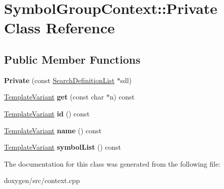 \hypertarget{class_symbol_group_context_1_1_private}{}\section{Symbol\+Group\+Context\+::Private Class Reference}
\label{class_symbol_group_context_1_1_private}
\subsection*{Public Member Functions}
\begin{DoxyCompactItemize}
\item 
\mbox{\label{class_symbol_group_context_1_1_private_a8772de05ec544d807e1ac17cf0039007}} 
{\bfseries Private} (const \mbox{\hyperlink{class_search_definition_list}{Search\+Definition\+List}} $\ast$sdl)
\item 
\mbox{\label{class_symbol_group_context_1_1_private_a9fc2a4c92d326cf087f13e2836890297}} 
\mbox{\hyperlink{class_template_variant}{Template\+Variant}} {\bfseries get} (const char $\ast$n) const
\item 
\mbox{\label{class_symbol_group_context_1_1_private_a1b10b26cede0b44f6aa4afeefec0c0dd}} 
\mbox{\hyperlink{class_template_variant}{Template\+Variant}} {\bfseries id} () const
\item 
\mbox{\label{class_symbol_group_context_1_1_private_a737098d6a7f9bd455a7ee62088e9b6ca}} 
\mbox{\hyperlink{class_template_variant}{Template\+Variant}} {\bfseries name} () const
\item 
\mbox{\label{class_symbol_group_context_1_1_private_a0a1ffb482f51205a576c92f736d971b3}} 
\mbox{\hyperlink{class_template_variant}{Template\+Variant}} {\bfseries symbol\+List} () const
\end{DoxyCompactItemize}


The documentation for this class was generated from the following file\+:\begin{DoxyCompactItemize}
\item 
doxygen/src/context.\+cpp\end{DoxyCompactItemize}
